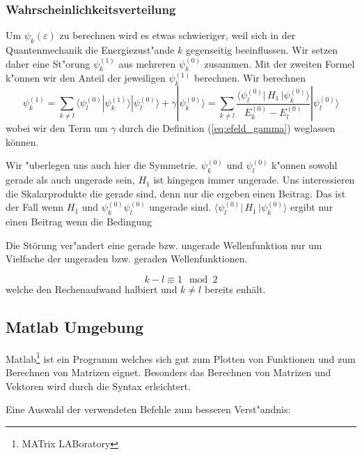 \begin{refsection}
\subsubsection{Wahrscheinlichkeitsverteilung}

Um $\psi_k(\varepsilon)$ zu berechnen wird es etwas schwieriger,
weil sich in der Quantenmechanik die Energiezust"ande $k$ gegenseitig beeinflussen.
Wir setzen daher eine St"orung $\psi_k^{(1)}$ aus mehreren $\psi_k^{(0)}$ zusammen.
Mit der zweiten Formel k"onnen wir den Anteil der jeweiligen $\psi_k^{(1)}$ berechnen.
Wir berechnen 
\[
\psi_k^{(1)} =
\sum_{k\ne l}
\langle\psi_l^{(0)}|\psi_k^{(1)}\rangle |\psi_l^{(0)}\rangle + \gamma|\psi_k^{(0)}\rangle
=
\sum_{k\ne l}
\frac{\langle \psi_l^{(0)}|\, H_1 \,|\psi_k^{(0)}\rangle}{E_k^{(0)}-E_l^{(0)}} |\psi_l^{(0)}\rangle
\]
wobei wir den Term um $\gamma$ durch die Definition (\ref{eq:efeld_gamma}) weglassen k\"onnen.

Wir "uberlegen uns auch hier die Symmetrie.
$\psi_k^{(0)}$ und $\psi_l^{(0)}$ k"onnen sowohl gerade als auch ungerade sein,
$H_1$ ist hingegen immer ungerade.
Uns interessieren die Skalarprodukte die gerade sind, denn nur die ergeben einen Beitrag.
Das ist der Fall wenn $H_1$ und $\psi_k^{(0)} \psi_l^{(0)}$ ungerade sind.
$\langle \psi_l^{(0)}|\, H_1 \,|\psi_k^{(0)}\rangle$ ergibt nur einen Beitrag wenn die Bedingung
\begin{result}
Die Störung ver"andert eine gerade bzw. ungerade Wellenfunktion nur um 
Vielfache der ungeraden bzw. geraden Wellenfunktionen.
\end{result}
\begin{equation}
  \label{eq:efeld_summebedingung}
  k-l \equiv 1 \mod 2
\end{equation}
welche den Rechenaufwand halbiert und $k \ne l$ bereits enh\"alt.



\subsection{Matlab Umgebung}

Matlab\footnote{MATrix LABoratory} ist ein Programm welches sich gut zum Plotten von Funktionen
und zum Berechnen von Matrizen eignet.
Besonders das Berechnen von Matrizen und Vektoren wird durch die Syntax erleichtert.

Eine Auswahl der verwendeten Befehle zum besseren Verst"andnis:


\end{refsection}
